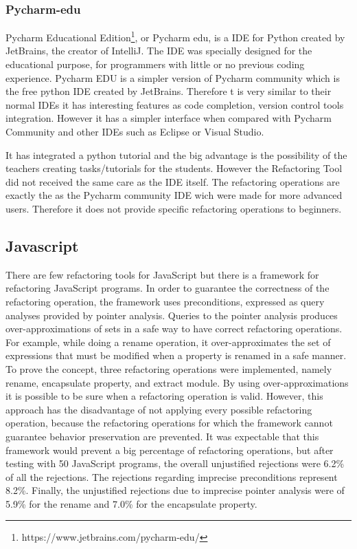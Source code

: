   \subsubsection{Pycharm-edu} %
  Pycharm Educational Edition\footnote{https://www.jetbrains.com/pycharm-edu/},
   or Pycharm edu, is a IDE for Python created by JetBrains,
  the creator of IntelliJ.
  The IDE was specially designed for the educational purpose, for programmers
  with little or no previous coding experience.
  Pycharm EDU is a simpler version of Pycharm community which is the free
  python IDE created by JetBrains.
  Therefore t is very similar to their normal IDEs it has interesting features
  as code completion, version control tools integration.
  However it has a simpler interface when compared with
  Pycharm Community and other IDEs such as Eclipse or Visual Studio. %

  It has integrated a python tutorial and the big advantage is the possibility of
  the teachers creating tasks/tutorials for the students.
  However the Refactoring Tool did not received the same care as the IDE itself.
  The refactoring operations are exactly the as the Pycharm community IDE wich were made
  for more advanced users.
  Therefore it does not provide specific refactoring operations to beginners.
\subsection{Javascript}
There are few refactoring tools for JavaScript but there is a framework
\cite{feldthaus2011tool} for refactoring JavaScript programs. %
In order to guarantee the correctness of the refactoring operation, the framework
uses preconditions, expressed as query analyses provided by pointer analysis. %
Queries to the pointer analysis produces over-approximations of sets in a safe way to
have correct refactoring operations.
For example, while doing a rename operation, it over-approximates the set of expressions
that must be modified when a property is renamed in a safe manner.
To prove the concept, three refactoring operations were implemented, namely rename,
encapsulate property, and extract module.
By using over-approximations it is possible to be sure when a refactoring
operation is valid.
However, this approach has the disadvantage of not applying every possible refactoring operation,
because the refactoring operations for which the framework cannot guarantee behavior
preservation are prevented.%
It was expectable that this framework would prevent a big percentage of refactoring
operations, but after testing with 50 JavaScript programs,
the overall unjustified rejections were 6.2\% of all the rejections.
The rejections regarding imprecise preconditions represent 8.2\%.
Finally, the unjustified rejections due to imprecise pointer analysis were of
5.9\% for the rename and 7.0\% for the encapsulate property.
